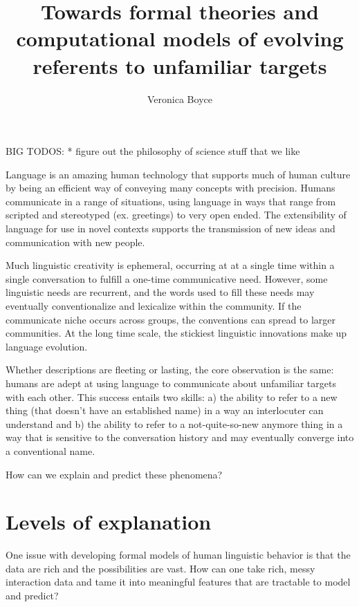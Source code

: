 \documentclass[]{article}
\title{Towards formal theories and computational models of evolving referents to unfamiliar targets}
\author{Veronica Boyce}
\begin{document}
	
	\maketitle
	
	
	BIG TODOS:
	* figure out the philosophy of science stuff that we like 
	

	
	Language is an amazing human technology that supports much of human culture by being an efficient way of conveying many concepts with precision. Humans communicate in a range of situations, using language in ways that range from scripted and stereotyped (ex. greetings) to very open ended. The extensibility of language for use in novel contexts supports the transmission of new ideas and communication with new people. 
	
	Much linguistic creativity is ephemeral, occurring at at a single time within a single conversation to fulfill a one-time communicative need.  However, some linguistic needs are recurrent, and the words used to fill these needs may eventually conventionalize and lexicalize within the community. If the communicate niche occurs across groups, the conventions can spread to larger communities.  At the long time scale, the stickiest linguistic innovations make up language evolution. 
	
	Whether descriptions are fleeting or lasting, the core observation is the same: humans are adept at using language to communicate about unfamiliar targets with each other. This success entails two skills: a) the ability to refer to a new thing (that doesn't have an established name) in a way an interlocuter can understand and b) the ability to refer to a not-quite-so-new anymore thing in a way that is sensitive to the conversation history and may eventually converge into a conventional name. 
	
	How can we explain and predict these phenomena?
	
	
	
	\section{Levels of explanation}
	One issue with developing formal models of human linguistic behavior is that the data are rich and the possibilities are vast. How can one take rich, messy interaction data and tame it into meaningful features that are tractable to model and predict? 
	
\end{document}
